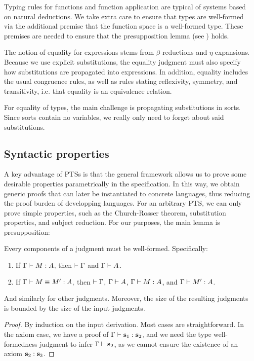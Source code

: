 Typing rules for functions and function application are typical of systems based on natural deductions.
We take extra care to ensure that types are well-formed via the additional premise that the function space is a well-formed type.
These premises are needed to ensure that the presupposition lemma (see ) holds.

The notion of equality for expressions stems from $\beta$-reductions and $\eta$-expansions.
Because we use explicit substitutions, the equality judgment must also specify how substitutions are propagated into expressions.
In addition, equality includes the usual congruence rules, as well as rules stating reflexivity, symmetry, and transitivity, i.e. that equality is an equivalence relation.

For equality of types, the main challenge is propagating substitutions in sorts.
Since sorts contain no variables, we really only need to forget about said substitutions.






\subsection{Syntactic properties}

A key advantage of \acp{PTS} is that the general framework allows us to prove some desirable properties parametrically in the specification.
In this way, we obtain generic proofs that can later be instantiated to concrete languages, thus reducing the proof burden of developping languages.
For an arbitrary \ac{PTS}, we can only prove simple properties, such as the Church-Rosser theorem, substitution properties, and subject reduction.
For our purposes, the main lemma is presupposition:
\begin{lemma}[Presupposition]
  \label{lemma:pts-presupposition}
  Every components of a judgment must be well-formed.
  Specifically:
  \begin{enumerate}
  \item If $\Gamma \vdash M : A$, then $\vdash \Gamma$ and $\Gamma \vdash A$.
  \item If $\Gamma \vdash M \equiv M' : A$, then $\vdash \Gamma$, $\Gamma \vdash A$, $\Gamma \vdash M : A$, and $\Gamma \vdash M' : A$.
  \end{enumerate}
  And similarly for other judgments.
  Moreover, the size of the resulting judgments is bounded by the size of the input judgments.
\end{lemma}
\begin{proof}
  By induction on the input derivation.
  Most cases are straightforward.
  In the axiom case, we have a proof of $\Gamma \vdash \textbf{s}_1 : \textbf{s}_2$,
    and we need the type well-formedness judgment to infer $\Gamma \vdash \textbf{s}_2$, as we cannot ensure the existence of an axiom $\textbf{s}_2 : \textbf{s}_3$.
\end{proof}

